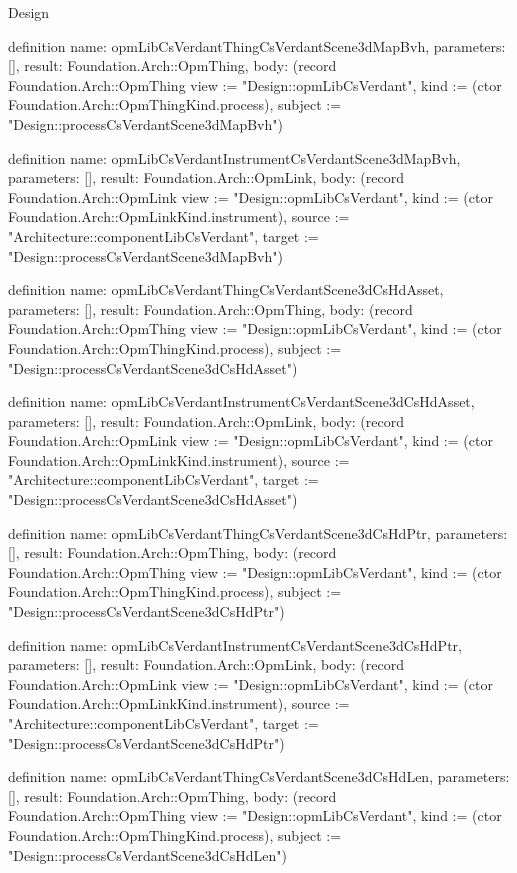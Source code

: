 \begin{lexlean}{Design}
\begin{semanticmodule}
definition{
  name: opmLibCsVerdantThingCsVerdantScene3dMapBvh,
  parameters: [],
  result: Foundation.Arch::OpmThing,
  body: (record Foundation.Arch::OpmThing {view := "Design::opmLibCsVerdant", kind := (ctor Foundation.Arch::OpmThingKind.process), subject := "Design::processCsVerdantScene3dMapBvh"})
}

definition{
  name: opmLibCsVerdantInstrumentCsVerdantScene3dMapBvh,
  parameters: [],
  result: Foundation.Arch::OpmLink,
  body: (record Foundation.Arch::OpmLink {view := "Design::opmLibCsVerdant", kind := (ctor Foundation.Arch::OpmLinkKind.instrument), source := "Architecture::componentLibCsVerdant", target := "Design::processCsVerdantScene3dMapBvh"})
}

definition{
  name: opmLibCsVerdantThingCsVerdantScene3dCsHdAsset,
  parameters: [],
  result: Foundation.Arch::OpmThing,
  body: (record Foundation.Arch::OpmThing {view := "Design::opmLibCsVerdant", kind := (ctor Foundation.Arch::OpmThingKind.process), subject := "Design::processCsVerdantScene3dCsHdAsset"})
}

definition{
  name: opmLibCsVerdantInstrumentCsVerdantScene3dCsHdAsset,
  parameters: [],
  result: Foundation.Arch::OpmLink,
  body: (record Foundation.Arch::OpmLink {view := "Design::opmLibCsVerdant", kind := (ctor Foundation.Arch::OpmLinkKind.instrument), source := "Architecture::componentLibCsVerdant", target := "Design::processCsVerdantScene3dCsHdAsset"})
}

definition{
  name: opmLibCsVerdantThingCsVerdantScene3dCsHdPtr,
  parameters: [],
  result: Foundation.Arch::OpmThing,
  body: (record Foundation.Arch::OpmThing {view := "Design::opmLibCsVerdant", kind := (ctor Foundation.Arch::OpmThingKind.process), subject := "Design::processCsVerdantScene3dCsHdPtr"})
}

definition{
  name: opmLibCsVerdantInstrumentCsVerdantScene3dCsHdPtr,
  parameters: [],
  result: Foundation.Arch::OpmLink,
  body: (record Foundation.Arch::OpmLink {view := "Design::opmLibCsVerdant", kind := (ctor Foundation.Arch::OpmLinkKind.instrument), source := "Architecture::componentLibCsVerdant", target := "Design::processCsVerdantScene3dCsHdPtr"})
}

definition{
  name: opmLibCsVerdantThingCsVerdantScene3dCsHdLen,
  parameters: [],
  result: Foundation.Arch::OpmThing,
  body: (record Foundation.Arch::OpmThing {view := "Design::opmLibCsVerdant", kind := (ctor Foundation.Arch::OpmThingKind.process), subject := "Design::processCsVerdantScene3dCsHdLen"})
}


\end{semanticmodule}
\end{lexlean}

